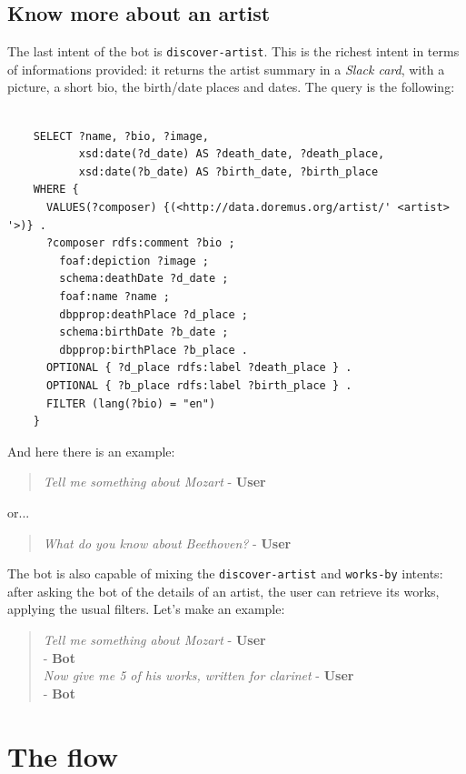 \documentclass[a4paper,12pt]{report}
\begin{document}
	\subsection{Know more about an artist}
	The last intent of the bot is \texttt{discover-artist}. This is the richest intent in terms of informations provided: it returns the artist summary in a \textit{Slack card}, with a picture, a short bio, the birth/date places and dates.
	The query is the following:
	\begin{lstlisting}
	
	SELECT ?name, ?bio, ?image,
	       xsd:date(?d_date) AS ?death_date, ?death_place,
	       xsd:date(?b_date) AS ?birth_date, ?birth_place
	WHERE {
	  VALUES(?composer) {(<http://data.doremus.org/artist/' <artist> '>)} .
	  ?composer rdfs:comment ?bio ;
	    foaf:depiction ?image ;
	    schema:deathDate ?d_date ;
	    foaf:name ?name ;
	    dbpprop:deathPlace ?d_place ;
	    schema:birthDate ?b_date ;
	    dbpprop:birthPlace ?b_place .
	  OPTIONAL { ?d_place rdfs:label ?death_place } .
	  OPTIONAL { ?b_place rdfs:label ?birth_place } .
	  FILTER (lang(?bio) = "en")
	}
	\end{lstlisting}
	And here there is an example:
	\begin{verse}
		\textit{Tell me something about Mozart} - \textbf{User}\\
	\end{verse}
	or...
	\begin{verse}
		\textit{What do you know about Beethoven?} - \textbf{User}\\
	\end{verse}

	The bot is also capable of mixing the \texttt{discover-artist} and \texttt{works-by} intents:
	after asking the bot of the details of an artist, the user can retrieve its works, applying the usual filters. Let's make an example:
	
	\begin{verse}
		\textit{Tell me something about Mozart} - \textbf{User}\\
		[Result with bio, picture, birth/death date/place] - \textbf{Bot}\\
		\textit{Now give me 5 of his works, written for clarinet} - \textbf{User}\\
		[Result with the 5 works of that artist] - \textbf{Bot}\\
	\end{verse}

	\section{The flow}
\end{document}
